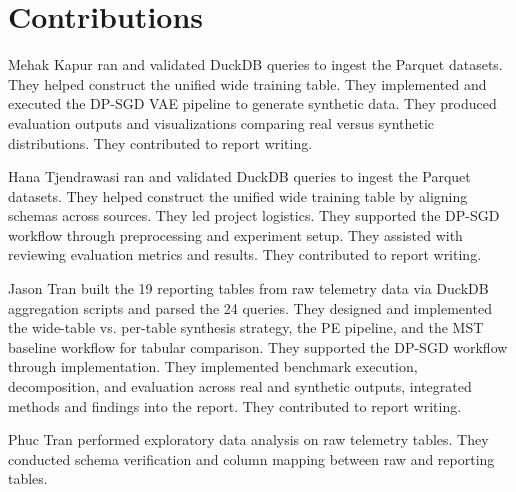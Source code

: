\documentclass[12pt,letterpaper]{article}
\renewcommand{\_}{\textunderscore\allowbreak}
\begin{document}
\newpage

\section{Contributions}

\noindent Mehak Kapur ran and validated DuckDB queries to ingest the Parquet datasets. They helped construct the unified wide training table. They implemented and executed the DP-SGD VAE pipeline to generate synthetic data. They produced evaluation outputs and visualizations comparing real versus synthetic distributions. They contributed to report writing.

\medskip
\noindent Hana Tjendrawasi ran and validated DuckDB queries to ingest the Parquet datasets. They helped construct the unified wide training table by aligning schemas across sources. They led project logistics. They supported the DP-SGD workflow through preprocessing and experiment setup. They assisted with reviewing evaluation metrics and results. They contributed to report writing.

\medskip
\noindent Jason Tran built the 19 reporting tables from raw telemetry data via DuckDB aggregation scripts and parsed the 24 queries. They designed and implemented the wide-table vs. per-table synthesis strategy, the PE pipeline, and the MST baseline workflow for tabular comparison. They supported the DP-SGD workflow through implementation. They implemented benchmark execution, decomposition, and evaluation across real and synthetic outputs, integrated methods and findings into the report. They contributed to report writing.

\medskip
\noindent Phuc Tran performed exploratory data analysis on raw telemetry tables. They conducted schema verification and column mapping between raw and reporting tables.
\end{document}
